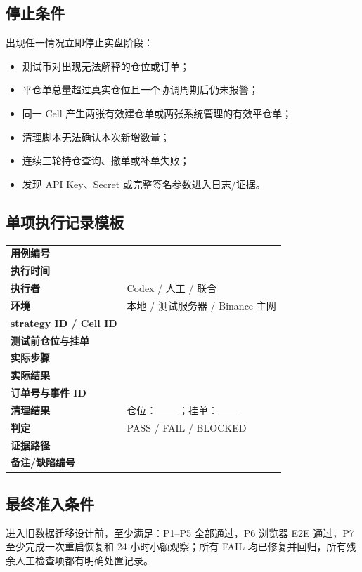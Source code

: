 \subsection{停止条件}

出现任一情况立即停止实盘阶段：

\begin{itemize}
  \item 测试币对出现无法解释的仓位或订单；
  \item 平仓单总量超过真实仓位且一个协调周期后仍未报警；
  \item 同一 Cell 产生两张有效建仓单或两张系统管理的有效平仓单；
  \item 清理脚本无法确认本次新增数量；
  \item 连续三轮持仓查询、撤单或补单失败；
  \item 发现 API Key、Secret 或完整签名参数进入日志/证据。
\end{itemize}

\subsection{单项执行记录模板}

\begin{tabularx}{\textwidth}{>{\bfseries}p{3.2cm}X}
  \toprule
  用例编号 & \\
  执行时间 & \\
  执行者 & Codex / 人工 / 联合 \\
  环境 & 本地 / 测试服务器 / Binance 主网 \\
  strategy ID / Cell ID & \\
  测试前仓位与挂单 & \\
  实际步骤 & \\
  实际结果 & \\
  订单号与事件 ID & \\
  清理结果 & 仓位：\_\_\_；挂单：\_\_\_ \\
  判定 & PASS / FAIL / BLOCKED \\
  证据路径 & \\
  备注/缺陷编号 & \\
  \bottomrule
\end{tabularx}

\subsection{最终准入条件}

进入旧数据迁移设计前，至少满足：P1--P5 全部通过，P6 浏览器 E2E 通过，P7 至少完成一次重启恢复和 24 小时小额观察；所有 FAIL 均已修复并回归，所有残余人工检查项都有明确处置记录。

